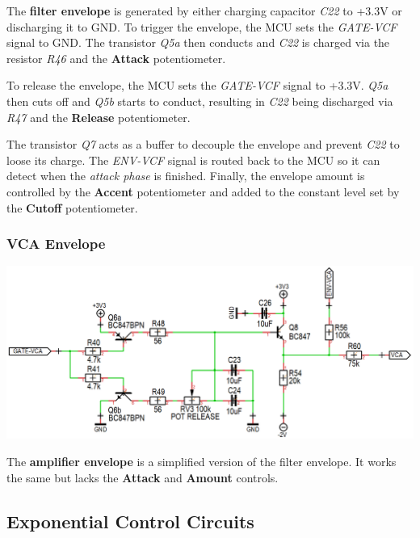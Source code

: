 \documentclass{scrartcl}
\begin{document}
The \textbf{filter envelope} is generated by either charging capacitor \emph{C22} to +3.3V or discharging it to GND.
To trigger the envelope, the MCU sets the \emph{GATE-VCF} signal to GND. The transistor \emph{Q5a} then conducts and \emph{C22} is charged via the resistor \emph{R46} and the \textbf{Attack} potentiometer.

To release the envelope, the MCU sets the \emph{GATE-VCF} signal to +3.3V. \emph{Q5a} then cuts off and \emph{Q5b} starts to conduct, resulting in \emph{C22} being discharged via \emph{R47} and the \textbf{Release} potentiometer.

The transistor \emph{Q7} acts as a buffer to decouple the envelope and prevent \emph{C22} to loose its charge. The \emph{ENV-VCF} signal is routed back to the MCU so it can detect when the \emph{attack phase} is finished. Finally, the envelope amount is controlled by the \textbf{Accent} potentiometer and added to the constant level set by the \textbf{Cutoff} potentiometer.

\subsubsection{VCA Envelope}

\begin{center}
    \includegraphics[scale=0.38]{assets/schema-ar-vca.png}
\end{center}

The \textbf{amplifier envelope} is a simplified version of the filter envelope. It works the same but lacks the \textbf{Attack} and \textbf{Amount} controls.

\subsection{Exponential Control Circuits}
\end{document}

